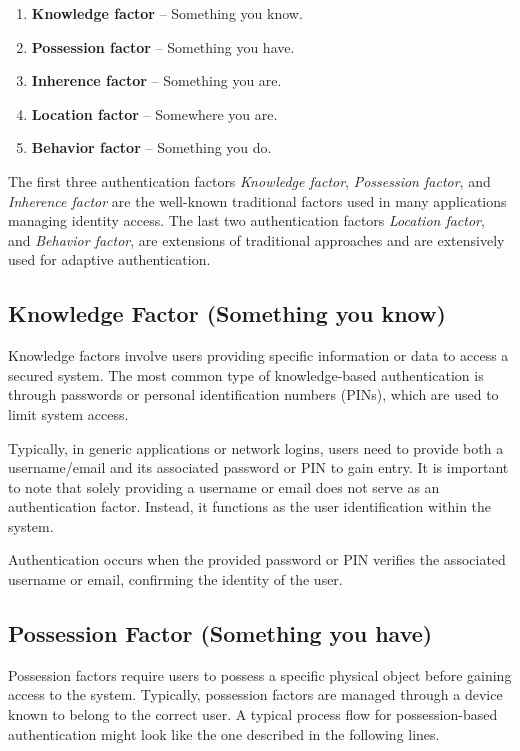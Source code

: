 \begin{enumerate}
    \item \textbf{Knowledge factor} -- Something you know.
    \item \textbf{Possession factor} -- Something you have.
    \item \textbf{Inherence factor} -- Something you are.
    \item \textbf{Location factor} -- Somewhere you are.
    \item \textbf{Behavior factor} -- Something you do.
\end{enumerate}

The first three authentication factors \textit{Knowledge factor}, \textit{Possession factor}, and \textit{Inherence factor} are the well-known traditional factors used in many applications managing identity access.
The last two authentication factors \textit{Location factor}, and \textit{Behavior factor}, are extensions of traditional approaches and are extensively used for adaptive authentication.\cite{auth-factors-descope}  

\subsection{Knowledge Factor (Something you know)}
Knowledge factors involve users providing specific information or data to access a secured system.
The most common type of knowledge-based authentication is through passwords or personal identification numbers (PINs), which are used to limit system access.

Typically, in generic applications or network logins, users need to provide both a username/email and its associated password or PIN to gain entry. It is important to note that solely providing a username or email does not serve as an authentication factor.
Instead, it functions as the user identification within the system.

Authentication occurs when the provided password or PIN verifies the associated username or email, confirming the identity of the user.

\subsection{Possession Factor (Something you have)}
Possession factors require users to possess a specific physical object before gaining access to the system.
Typically, possession factors are managed through a device known to belong to the correct user.
A typical process flow for possession-based authentication might look like the one described in the following lines.

